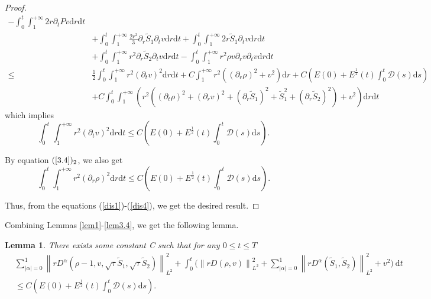 \documentclass[10pt,reqno]{amsart}
\numberwithin{equation}{section}
\newtheorem{lemma}[theorem]{Lemma}
\begin{document}
\begin{proof}
\begin{equation}
\begin{aligned}
				-\int_0^t\int_{1}^{+\infty}2r\partial_{t}Pv\mathrm{d}r\mathrm{d}t
				\\
				&+\int_0^t\int_{1}^{+\infty}\frac{2r^2}{3}\partial_r\tilde{S}_1\partial_{t}v\mathrm{d}r\mathrm{d}t
				+\int_0^t\int_{1}^{+\infty}2r\tilde{S}_1\partial_{t}v\mathrm{d}r\mathrm{d}t\\
				&+\int_0^t\int_{1}^{+\infty}r^2\partial_r\tilde{S}_2\partial_{t}v\mathrm{d}r\mathrm{d}t
				-\int_0^t\int_{1}^{+\infty}r^2\rho v \partial_{r}v\partial_{t}v\mathrm{d}r\mathrm{d}t\\
				\leq&\frac{1}{2}\int_0^t\int_{1}^{+\infty}r^2(\partial_{t}v)^2\mathrm{d}r\mathrm{d}t
				+C\int_{1}^{+\infty}r^2((\partial_{r}\rho)^2+v^2)\mathrm{d}r
				+C(E(0)+E^{\frac{1}{2}}(t)\int_{0}^{t} \mathcal{D}(s)\mathrm{d}s)\\
				&+C\int_0^t\int_{1}^{+\infty}\left(r^2((\partial_{t}\rho)^2
				+(\partial_{r}v)^2+(\partial_r\tilde{S}_1)^2 +\tilde{S}_1^2+(\partial_r\tilde{S}_2)^2)
				+v^2\right)
				\mathrm{d}r\mathrm{d}t
			\end{aligned}
		\end{equation}
		which implies
		\begin{equation}\label{dis3}
			\int_0^t\int_{1}^{+\infty}r^2(\partial_{t}v)^2
			\mathrm{d}r\mathrm{d}t
			\leq C(E(0)+E^{\frac{1}{2}}(t)\int_{0}^{t} \mathcal{D}(s)\mathrm{d}s).
		\end{equation}
		
		By equation $(\ref{3.4})_2$, we also get
		\begin{equation}\label{dis4}
			\int_0^t\int_{1}^{+\infty}r^2(\partial_{r}\rho)^2
			\mathrm{d}r\mathrm{d}t
			\leq C(E(0)+E^{\frac{1}{2}}(t)\int_{0}^{t} \mathcal{D}(s)\mathrm{d}s).
		\end{equation}
		
		Thus, from the equations (\ref{dis1})-(\ref{dis4}), we get the desired result.
	\end{proof}
	
	Combining Lemmas \ref{lem1}-\ref{lem3.4},  we get the following lemma.
	\begin{lemma}\label{lem3.5}
		There exists some constant C such that for any $0\le t \le T$
		\begin{equation}
			\begin{aligned}
				&\sum_{|\alpha|=0}^1\left\|rD^\alpha(\rho-1, v, \sqrt{\tau} \tilde{S}_1, \sqrt{\tau} \tilde{S}_2)\right\|_{L^{2}}^2
				+\int_{0}^{t}\bigg(\left\|r D(\rho, v)\right\|_{L^2}^2
				+\sum_{|\alpha|=0}^1\left\|r D^\alpha(\tilde{S}_1, \tilde{S}_2)\right\|_{L^{2}}^2+v^2\bigg)\mathrm{~d} t
				\\&
				\leq C \left(E(0)+E^{\frac{1}{2}}(t) \int_{0}^{t}\mathcal{D}(s)\mathrm{d}s\right).
			\end{aligned}
		\end{equation}
	\end{lemma}
\end{document}
